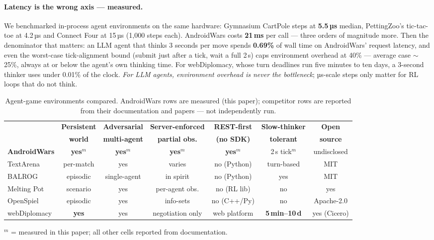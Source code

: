 \documentclass[10pt]{article}
\begin{document}
\paragraph{Latency is the wrong axis --- measured.} We benchmarked in-process agent environments on the same hardware: Gymnasium CartPole steps at \textbf{5.5\,µs} median, PettingZoo's tic-tac-toe at 4.2\,µs and Connect Four at 15\,µs (1{,}000 steps each). AndroidWars costs \textbf{21\,ms} per call --- three orders of magnitude more. Then the denominator that matters: an LLM agent that thinks 3 seconds per move spends \textbf{0.69\%} of wall time on AndroidWars' request latency, and even the worst-case tick-alignment bound (submit just after a tick, wait a full 2\,s) caps environment overhead at 40\% --- average case $\sim$25\%, always at or below the agent's own thinking time. For webDiplomacy, whose turn deadlines run five minutes to ten days, a 3-second thinker uses under 0.01\% of the clock. \emph{For LLM agents, environment overhead is never the bottleneck}; µs-scale steps only matter for RL loops that do not think.

\begin{table}[t]
\caption{Agent-game environments compared. AndroidWars rows are measured (this paper); competitor rows are reported from their documentation and papers --- not independently run.}
\label{tab:envs}
\begin{center}
\scriptsize
\begin{tabular}{lcccccc}
\toprule
& \bf Persistent & \bf Adversarial & \bf Server-enforced & \bf REST-first & \bf Slow-thinker & \bf Open \\
& \bf world & \bf multi-agent & \bf partial obs. & \bf (no SDK) & \bf tolerant & \bf source \\
\midrule
\bf AndroidWars & \bf yes$^m$ & \bf yes$^m$ & \bf yes$^m$ & \bf yes$^m$ & 2\,s tick$^m$ & undisclosed \\
TextArena & per-match & yes & varies & no (Python) & turn-based & MIT \\
BALROG & episodic & single-agent & in spirit & no (Python) & yes & MIT \\
Melting Pot & scenario & yes & per-agent obs. & no (RL lib) & no & yes \\
OpenSpiel & episodic & yes & info-sets & no (C++/Py) & no & Apache-2.0 \\
webDiplomacy & \bf yes & yes & negotiation only & web platform & \bf 5\,min--10\,d & yes (Cicero) \\
\bottomrule
\end{tabular}
\end{center}
\vspace{2pt}
{\scriptsize $^m$ = measured in this paper; all other cells reported from documentation.}
\end{table}
\end{document}
